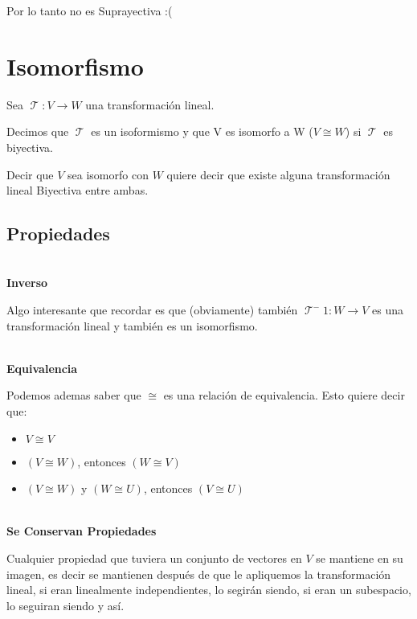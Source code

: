 \documentclass[12pt]{report}                                %
\DeclareMathOperator \LinealTransformation {\mathcal{T}}
\begin{document}
            Por lo tanto no es Suprayectiva :(


    \clearpage
    \section{Isomorfismo}
        Sea $\LinealTransformation : V \to W $ una transformación lineal.

        Decimos que $\LinealTransformation$ es un isoformismo y que V es isomorfo a W 
        ($V \cong W$) si $\LinealTransformation$ es biyectiva.

        Decir que $V$ sea isomorfo con $W$ quiere decir que existe alguna transformación
        lineal Biyectiva entre ambas.

        \subsection{Propiedades}

            \textbf{\\Inverso}

            Algo interesante que recordar es que (obviamente) también
            $\LinealTransformation^-1 : W \to V $ es una transformación lineal
            y también es un isomorfismo.

            \textbf{\\Equivalencia}

            Podemos ademas saber que $\cong$ es una relación de equivalencia.
            Esto quiere decir que:

            \begin{itemize}
                \item $V \cong V$
                \item $(V \cong W)$, entonces $(W \cong V)$
                \item $(V \cong W)$ y $(W \cong U)$, entonces $(V \cong U)$
            \end{itemize}

            \textbf{\\Se Conservan Propiedades}

            Cualquier propiedad que tuviera un conjunto de vectores en $V$ se mantiene
            en su imagen, es decir se mantienen después de que le apliquemos la
            transformación lineal, si eran linealmente independientes, lo segirán siendo,
            si eran un subespacio, lo seguiran siendo y así.
\end{document}
